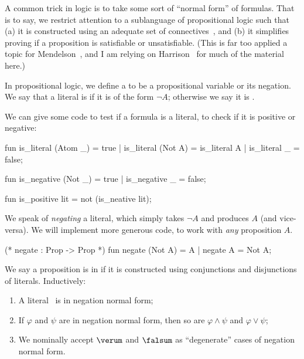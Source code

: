 \begin{node}\label{prop-000P}%
A common trick in logic is to take some sort of ``normal form'' of
formulas. That is to say, we restrict attention to a sublanguage of
propositional logic such that (a) it is constructed using an adequate
set of connectives~, and (b) it simplifies proving if a
proposition is satisfiable or unsatisfiable. (This is far too applied a
topic for Mendelson~\cite{mendelson2015mathematical}, and I am relying on
Harrison~\cite{harrison2009handbook} for much of the material here.)

\begin{definition}\label{prop-000Q}%
In propositional logic, we define a  to be a
propositional variable or its negation. We say that a literal is
 if it is of the form $\neg A$; otherwise we say it is
.

\begin{node}\label{prop:normal-form-000F}%
We can give some code to test if a formula is a literal, to check if it
is positive or negative:

\begin{sml}
fun is_literal (Atom _) = true
 |  is_literal (Not A) = is_literal A
 |  is_literal _ = false;

fun is_negative (Not _) = true
 |  is_negative _ = false;

fun is_positive lit = not (is_neative lit);
\end{sml}
\end{node}

\begin{node}[Negation]\label{prop:normal-form-000G}%
We speak of \emph{negating} a literal, which simply takes $\neg A$ and
produces $A$ (and vice-versa). We will implement more generous code, to
work with \emph{any} proposition $A$.

\begin{sml}
(* negate : Prop -> Prop *)
fun negate (Not A) = A
 |  negate A = Not A;
\end{sml}
\end{node}
\end{definition}

\begin{definition}\label{prop-000O}%
We say a proposition is in  if it is
constructed using conjunctions and disjunctions of
literals. Inductively:
\begin{enumerate}
\item A literal~ is in negation normal form;
\item If $\varphi$ and $\psi$ are in negation normal form, then so are
  $\varphi\land\psi$ and $\varphi\lor\psi$;
\item We nominally accept $\verum$ and $\falsum$ as ``degenerate'' cases
  of negation normal form.
\end{enumerate}
\end{definition}


\end{node}
